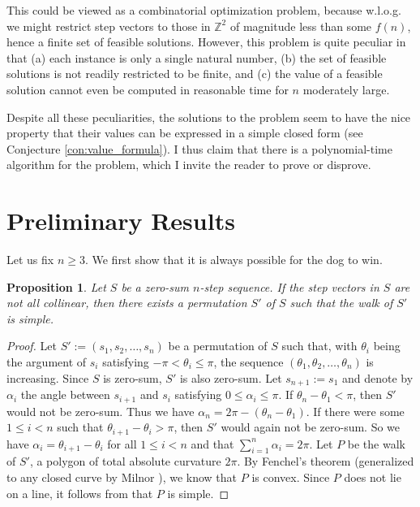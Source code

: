 \documentclass{amsart}
\newtheorem{proposition}{Proposition}[section]
\theoremstyle{definition}
\theoremstyle{problem}
\theoremstyle{remark}
\begin{document}
This could be viewed as a combinatorial optimization problem,
because w.l.o.g. we might restrict step vectors
to those in $\mathbb{Z}^2$ of magnitude less than some $f(n)$,
hence a finite set of feasible solutions. However, this problem is
quite peculiar in that
(a) each instance is only a single natural number,
(b) the set of feasible solutions is not readily restricted to be finite,
and (c) the value of a feasible solution cannot even be computed
in reasonable time for $n$ moderately large.

Despite all these peculiarities, the solutions to the problem seem
to have the nice property that their values can be expressed
in a simple closed form (see Conjecture \ref{con:value_formula}).
I thus claim that there is a polynomial-time algorithm for the problem,
which I invite the reader to prove or disprove.

\section{Preliminary Results}

Let us fix $n\ge3$. We first show that it is always possible for the dog to win.

\begin{proposition}
    Let $S$ be a zero-sum $n$-step sequence. If the step vectors in $S$ are not all collinear,
    then there exists a permutation $S'$ of $S$ such that the walk of $S'$ is simple.
\end{proposition}

\begin{proof}
    Let $S':=(s_1,s_2,\dots,s_n)$ be a permutation of $S$ such that, with
    $\theta_i$ being the argument of $s_i$ satisfying $-\pi<\theta_i\le\pi$,
    the sequence $(\theta_1,\theta_2,\dots,\theta_n)$ is increasing.
    Since $S$ is zero-sum, $S'$ is also zero-sum.
    Let $s_{n+1}:=s_1$ and denote by $\alpha_i$ the angle between
    $s_{i+1}$ and $s_i$ satisfying $0\le\alpha_i\le\pi$.
    If $\theta_n-\theta_1<\pi$, then $S'$ would not be zero-sum.
    Thus we have $\alpha_n=2\pi-(\theta_n-\theta_1)$.
    If there were some $1\le i<n$ such that $\theta_{i+1}-\theta_{i}>\pi$,
    then $S'$ would again not be zero-sum. So we have $\alpha_i=\theta_{i+1}-\theta_i$
    for all $1\le i<n$ and that $\sum_{i=1}^n\alpha_i=2\pi$.
    Let $P$ be the walk of $S'$, a polygon of total absolute curvature $2\pi$.
    By Fenchel's theorem (generalized to any closed curve by Milnor
    \cite[Theorem 3.4]{milnor}), we know that $P$ is convex. Since $P$
    does not lie on a line, it follows from \cite[Theorem 2.2]{ye}
    that $P$ is simple.
\end{proof}
\end{document}
